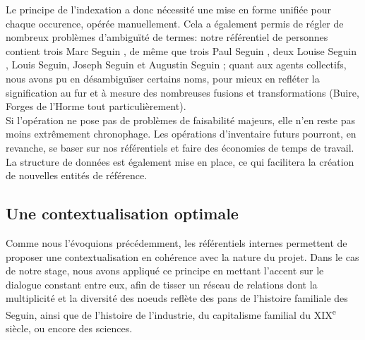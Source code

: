\documentclass[a4paper,12pt,twoside]{book}
\begin{document}
Le principe de l'indexation a donc nécessité une mise en forme unifiée pour chaque occurence, opérée manuellement. Cela a également permis de régler de nombreux problèmes d'ambiguïté de termes: notre référentiel de personnes contient trois \og Marc Seguin \fg, de même que trois \og Paul Seguin \fg, deux \og Louise Seguin \fg, \og Louis Seguin\fg, \og Joseph Seguin \fg{} et \og Augustin Seguin \fg; quant aux agents collectifs, nous avons pu en désambiguïser certains noms, pour mieux en refléter la signification au fur et à mesure des nombreuses fusions et transformations (\og Buire\fg, \og Forges de l'Horme\fg{} tout particulièrement).\\

Si l'opération ne pose pas de problèmes de faisabilité majeurs, elle n'en reste pas moins extrêmement chronophage. Les opérations d'inventaire futurs pourront, en revanche, se baser sur nos référentiels et faire des économies de temps de travail. La structure de données est également mise en place, ce qui facilitera la création de nouvelles entités de référence.


\subsection{Une contextualisation optimale}

Comme nous l'évoquions précédemment, les référentiels internes permettent de proposer une contextualisation en cohérence avec la nature du projet. Dans le cas de notre stage, nous avons appliqué ce principe en mettant l'accent sur le dialogue constant entre eux, afin de tisser un réseau de relations dont la multiplicité et la diversité des noeuds reflète des pans de l'histoire familiale des Seguin, ainsi que de l'histoire de l'industrie, du capitalisme familial du XIX\textsuperscript{e} siècle, ou encore des sciences. 
\end{document}
